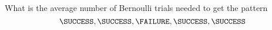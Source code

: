 What is the average number of Bernoulli trials needed to
get the pattern
\[
\SUCCESS, \SUCCESS, \FAILURE, \SUCCESS, \SUCCESS 
\]
